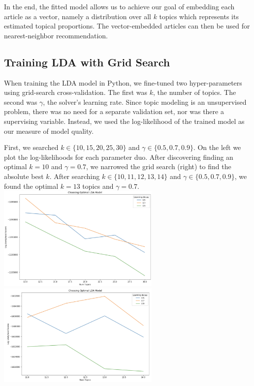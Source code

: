 \documentclass[11pt]{article}
\begin{document}
In the end, the fitted model allows us to achieve our goal of embedding each article as a vector, namely a distribution over all $k$ topics which represents its estimated topical proportions. The vector-embedded articles can then be used for nearest-neighbor recommendation. 

\subsection{Training LDA with Grid Search}
When training the LDA model in Python, we fine-tuned two hyper-parameters using grid-search cross-validation. The first was $k$, the number of topics.  The second was $\gamma$, the solver's learning rate.  Since topic modeling is an unsupervised problem, there was no need for a separate validation set, nor was there a supervising variable.  Instead, we used the log-likelihood of the trained model as our measure of model quality. 

First, we searched $k \in \{10, 15, 20, 25, 30\}$ and $\gamma \in \{0.5, 0.7, 0.9\}$. On the left we plot the 
log-likelihoods for each parameter duo. After discovering finding an optimal $k=10$ and $\gamma = 0.7$, 
we narrowed the grid search (right) to find the absolute best $k$.  After searching $k \in \{10, 11, 12, 13, 14\}$ 
and $\gamma \in \{0.5, 0.7, 0.9\}$, we found the optimal $k=13$ topics and $\gamma = 0.7$. \\

\includegraphics[width=225pt]{gridsearch.png} \includegraphics[width=225pt]{gridsearch2.png} 
\end{document}
